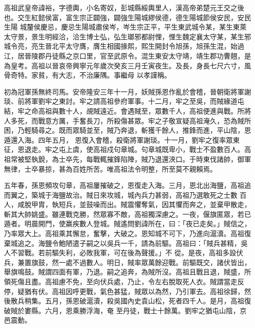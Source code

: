 
\begin{pinyinscope}

 高祖武皇帝諱裕，字德輿，小名寄奴，彭城縣綏輿里人，漢高帝弟楚元王交之後也。交生紅懿侯富，富生宗正闢強，闢強生陽城繆侯德，德生陽城節侯安民，安民生陽
 城釐侯慶忌，慶忌生陽城肅侯岑，岑生宗正平，平生東武城令某，某生東萊太守景，景生明經洽，洽生博士弘，弘生瑯邪都尉悝，悝生魏定襄太守某，某生邪城令亮，亮生晉北平太守膺，膺生相國掾熙，熙生開封令旭孫，旭孫生混，始過江，居晉陵郡丹徒縣之京口里，官至武原令。混生東安太守靖，靖生郡功曹翹，是為皇考。高祖以晉哀帝興寧元年歲次癸亥三月壬寅夜生。及長，身長七尺六寸，風骨奇特。家貧，有大志，不治廉隅。事繼母
 以孝謹稱。



 初為冠軍孫無終司馬。安帝隆安三年十一月，妖賊孫恩作亂於會稽，晉朝衛將軍謝琰、前將軍劉牢之東討。牢之請高祖參府軍事。十二月，牢之至吳，而賊緣道屯結，牢之命高祖與數十人，覘賊遠近。會遇賊至，眾數千人，高祖便進與戰。所將人多死，而戰意方厲，手奮長刀，所殺傷甚眾。牢之子敬宣疑高祖淹久，恐為賊所困，乃輕騎尋之。既而眾騎並至，賊乃奔退，斬獲千餘人，推鋒而進，平山陰，恩遁還入海。四年五月，
 恩復入會稽，殺衛將軍謝琰。十一月，劉牢之復率眾東征，恩退走。牢之屯上虞，使高祖戍句章城。句章城既卑小，戰士不盈數百人。高祖常被堅執銳，為士卒先，每戰輒摧鋒陷陣，賊乃退還浹口。于時東伐諸帥，御軍無律，士卒暴掠，甚為百姓所苦。唯高祖法令明整，所至莫不親賴焉。



 五年春，孫恩頻攻句章，高祖屢摧破之，恩復走入海。三月，恩北出海鹽，高祖追而翼之，築城于海鹽故治。賊日來攻城，城內兵力甚弱，高祖乃選敢死之士數
 百人，咸脫甲胄，執短兵，並鼓噪而出。賊震懼奪氣，因其懼而奔之，並棄甲散走，斬其大帥姚盛。雖連戰克勝，然眾寡不敵，高祖獨深慮之。一夜，偃旗匿眾，若已遁者。明晨開門，使羸疾數人登城。賊遙問劉諱所在，曰：「夜已走矣。」賊信之，乃率眾大上。高祖乘其懈怠，奮擊，大破之。恩知城不可下，乃進向滬瀆。高祖復棄城追之。海鹽令鮑陋遣子嗣之以吳兵一千，請為前驅。高祖曰：「賊兵甚精，吳人不習戰。若前驅失利，必敗我軍，可在後為聲援。」不
 從。是夜，高祖多設伏兵，兼置旗鼓，然一處不過數人。明日，賊率眾萬餘迎戰。前驅既交，諸伏皆出，舉旗鳴鼓。賊謂四面有軍，乃退。嗣之追奔，為賊所沒。高祖且戰且退，賊盛，所領死傷且盡。高祖慮不免，至向伏兵處，乃止，令左右脫取死人衣。賊謂當走反停，疑猶有伏。高祖因呼更戰，氣色甚猛，賊眾以為然，乃引軍去。高祖徐歸，然後散兵稍集。五月，孫恩破滬瀆，殺吳國內史袁山松，死者四千人。是月，高祖復破賊於婁縣。六月，恩乘勝浮海，奄
 至丹徒，戰士十餘萬。劉牢之猶屯山陰，京邑震動。




\end{pinyinscope}

